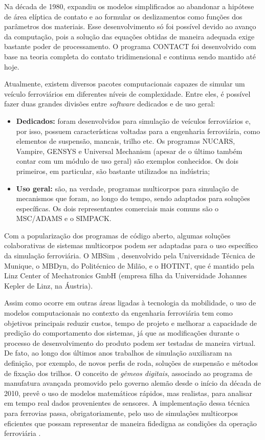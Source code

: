 Na década de 1980, \citeauthor{kalker_principle_1986} expandiu os modelos simplificados ao abandonar a hipótese de área elíptica de contato e ao formular os 
deslizamentos como funções dos parâmetros dos materiais. Esse desenvolvimento só foi possível devido ao avanço da computação, pois
a solução das equações obtidas de maneira adequada exige bastante poder de processamento. O programa CONTACT foi desenvolvido com base
na teoria completa do contato tridimensional e continua sendo mantido até hoje.

Atualmente, existem diversos pacotes computacionais capazes de simular um veículo ferroviários em diferentes níveis de complexidade. Entre eles, é possível fazer duas grandes divisões entre \textit{software} dedicados e de uso geral:
\begin{itemize}
 \item \textbf{Dedicados:} foram desenvolvidos para simulação de veículos ferroviários e, por isso, possuem características voltadas para a engenharia ferroviária, como elementos de suspensão, mancais, trilho etc. Os programas NUCARS, Vampire, GENSYS e Universal Mechanism (apesar de o último também contar com um módulo de uso geral) são exemplos conhecidos. Os dois primeiros, em particular, são bastante utilizados na indústria;
 \item \textbf{Uso geral:} são, na verdade, programas multicorpos para simulação de mecanismos que foram, ao longo do tempo, sendo adaptados para soluções específicas. Os dois representantes comerciais mais comuns são o MSC/ADAMS e o SIMPACK.
\end{itemize}
Com a popularização dos programas de código aberto, algumas soluções colaborativas de sistemas multicorpos podem ser adaptadas para o uso específico da simulação ferroviária. O MBSim \cite{schindler_analysing_2010}, desenvolvido pela Universidade Técnica de Munique, o MBDyn, do Politécnico de Milão, e o HOTINT, que é mantido pela Linz Center of Mechatronics GmbH (empresa filha da Universidade Johannes Kepler de Linz, na Áustria).

Assim como ocorre em outras áreas ligadas à tecnologia da mobilidade, o uso de modelos computacionais no contexto da engenharia ferroviária tem como objetivos principais reduzir custos, tempo de projeto e melhorar a capacidade de predição do comportamento dos sistemas, já que as modificações durante o processo de desenvolvimento do produto podem ser testadas de maneira virtual. De fato, ao longo dos últimos anos trabalhos de simulação auxiliaram na definição, por exemplo, de novos perfis de roda, soluções de suspensão e métodos de fixação dos trilhos. O conceito de \textit{gêmeos digitais}, associado ao programa de manufatura avançada promovido pelo governo alemão desde o início da década de 2010, prevê o uso de modelos matemáticos rápidos, mas realistas, para analisar em tempo real dados provenientes de sensores. A implementação dessa técnica para ferrovias passa, obrigatoriamente, pelo uso de simulações multicorpos eficientes que possam representar de maneira fidedigna as condições da operação ferroviária \cite{dimitrova_digital_2021,errandonea_iot_2021}.

